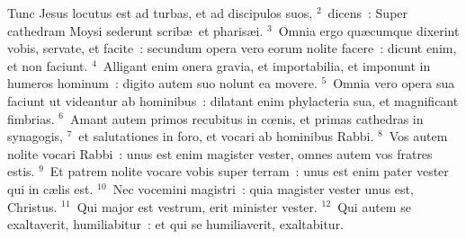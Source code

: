 \lettrine[lines=10,image=true,loversize=0.05,lraise=-0.03]{T}{}unc Jesus locutus est ad turbas, et ad discipulos suos,
${}^{2}$~dicens~: Super cathedram Moysi sederunt scrib\ae\ et pharis\ae i.
${}^{3}$~Omnia ergo qu\ae cumque dixerint vobis, servate, et facite~: secundum opera vero eorum nolite facere~: dicunt enim, et non faciunt.
${}^{4}$~Alligant enim onera gravia, et importabilia, et imponunt in humeros hominum~: digito autem suo nolunt ea movere.
${}^{5}$~Omnia vero opera sua faciunt ut videantur ab hominibus~: dilatant enim phylacteria sua, et magnificant fimbrias.
${}^{6}$~Amant autem primos recubitus in cœnis, et primas cathedras in synagogis,
${}^{7}$~et salutationes in foro, et vocari ab hominibus Rabbi.
${}^{8}$~Vos autem nolite vocari Rabbi~: unus est enim magister vester, omnes autem vos fratres estis.
${}^{9}$~Et patrem nolite vocare vobis super terram~: unus est enim pater vester qui in c\ae lis est.
${}^{10}$~Nec vocemini magistri~: quia magister vester unus est, Christus.
${}^{11}$~Qui major est vestrum, erit minister vester.
${}^{12}$~Qui autem se exaltaverit, humiliabitur~: et qui se humiliaverit, exaltabitur.


